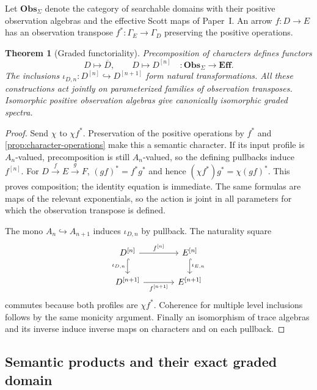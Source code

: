 \documentclass[11pt,a4paper]{article}
\numberwithin{equation}{section}
\newtheorem{theorem}{Theorem}[section]
\theoremstyle{definition}
\theoremstyle{remark}
\theoremstyle{plain}
\newcommand{\E}{\mathbf{Eff}}
\newcommand{\incl}{\hookrightarrow}
\newcommand{\ObsCat}{\mathbf{Obs}_{\Sigma}}
\begin{document}
Let $\ObsCat$ denote the category of searchable domains with their
positive observation algebras and the effective Scott maps of Paper~I.
An arrow $f:D\to E$ has an observation transpose
$f^*:\Gamma_E\to\Gamma_D$ preserving the positive operations.

\begin{theorem}[Graded functoriality]
\label{thm:graded-functoriality}
Precomposition of characters defines functors
\[
 D\longmapsto\overline D,\qquad
 D\longmapsto D^{[n]}\quad:\ObsCat\longrightarrow\E.
\]
The inclusions $\iota_{D,n}:D^{[n]}\incl D^{[n+1]}$ form natural
transformations. All these constructions act jointly on parameterized
families of observation transposes. Isomorphic positive observation
algebras give canonically isomorphic graded spectra.
\end{theorem}
\begin{proof}
Send $\chi$ to $\chi f^*$. Preservation of the positive operations by
$f^*$ and \cref{prop:character-operations} make this a semantic
character. If its input profile is $A_n$-valued, precomposition is still
$A_n$-valued, so the defining pullbacks induce $f^{[n]}$.
For $D\xrightarrow fE\xrightarrow gF$,
$(gf)^*=f^*g^*$ and hence
$(\chi f^*)g^*=\chi(gf)^*$. This proves composition; the identity
equation is immediate. The same formulas are maps of the relevant
exponentials, so the action is joint in all parameters for which the
observation transpose is defined.

The mono $A_n\incl A_{n+1}$ induces $\iota_{D,n}$ by pullback.
The naturality square
\begin{equation}\label{diag:level-naturality}
\begin{tikzcd}[column sep=large]
 D^{[n]}\ar[r,"f^{[n]}"]\ar[d,hook,"\iota_{D,n}"']&
 E^{[n]}\ar[d,hook,"\iota_{E,n}"]\\
 D^{[n+1]}\ar[r,"f^{[n+1]}"']&E^{[n+1]}
\end{tikzcd}
\end{equation}
commutes because both profiles are $\chi f^*$. Coherence for multiple
level inclusions follows by the same monicity argument. Finally an
isomorphism of trace algebras and its inverse induce inverse maps on
characters and on each pullback.
\end{proof}

\subsection{Semantic products and their exact graded domain}
\end{document}
